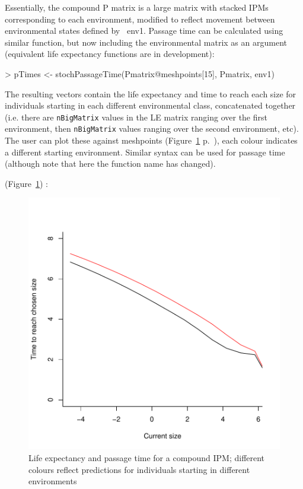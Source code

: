 \documentclass{article}
\begin{document}
Essentially, the compound P matrix is a large matrix with stacked IPMs
corresponding to each environment, modified to reflect movement
between environmental states defined by {\ env1}. Passage time can be
calculated using similar function, but now including the environmental
matrix as an argument (equivalent life expectancy functions are in development): 
\begin{Schunk}
\begin{Sinput}
> pTimes <- stochPassageTime(Pmatrix@meshpoints[15], Pmatrix, env1)
\end{Sinput}
\end{Schunk}
The resulting vectors contain the life expectancy and time to reach each size for individuals starting in each different environmental class, concatenated together (i.e. there are {\tt nBigMatrix} values in the LE matrix ranging over the first environment, then {\tt nBigMatrix} values ranging over the second environment, etc). The user can plot these against meshpoints 
(Figure~\ref{fig:five} p.~\pageref{fig:five}), 
each colour indicates a different starting environment. Similar syntax can be used for passage time (although note that here the function name has changed).  

(Figure~\ref{fig:five}) : 
\begin{figure}
\begin{center}
\includegraphics{IPMpack_Vignette-fig5}
\end{center}
\caption{Life expectancy and passage time for a compound IPM;   different colours reflect predictions for individuals starting in different environments}
\label{fig:five}
\end{figure}
\end{document}
